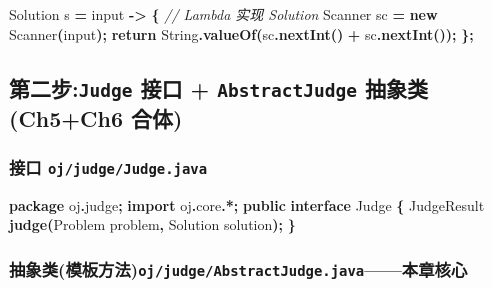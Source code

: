 \documentclass[
  11pt,
]{ctexart}
\newenvironment{Shaded}{\begin{snugshade}}{\end{snugshade}}
\newcommand{\BuiltInTok}[1]{#1}
\newcommand{\CommentTok}[1]{\textcolor[rgb]{0.56,0.35,0.01}{\textit{#1}}}
\newcommand{\ControlFlowTok}[1]{\textcolor[rgb]{0.13,0.29,0.53}{\textbf{#1}}}
\newcommand{\FunctionTok}[1]{\textcolor[rgb]{0.13,0.29,0.53}{\textbf{#1}}}
\newcommand{\ImportTok}[1]{#1}
\newcommand{\KeywordTok}[1]{\textcolor[rgb]{0.13,0.29,0.53}{\textbf{#1}}}
\newcommand{\NormalTok}[1]{#1}
\newcommand{\OperatorTok}[1]{\textcolor[rgb]{0.81,0.36,0.00}{\textbf{#1}}}
\begin{document}
\begin{Shaded}
\begin{Highlighting}[]
\NormalTok{Solution s }\OperatorTok{=}\NormalTok{ input }\OperatorTok{{-}\textgreater{}} \OperatorTok{\{}                 \CommentTok{// Lambda 实现 Solution}
    \BuiltInTok{Scanner}\NormalTok{ sc }\OperatorTok{=} \KeywordTok{new} \BuiltInTok{Scanner}\OperatorTok{(}\NormalTok{input}\OperatorTok{);}
    \ControlFlowTok{return} \BuiltInTok{String}\OperatorTok{.}\FunctionTok{valueOf}\OperatorTok{(}\NormalTok{sc}\OperatorTok{.}\FunctionTok{nextInt}\OperatorTok{()} \OperatorTok{+}\NormalTok{ sc}\OperatorTok{.}\FunctionTok{nextInt}\OperatorTok{());}
\OperatorTok{\};}
\end{Highlighting}
\end{Shaded}

\hypertarget{ux7b2cux4e8cux6b65judge-ux63a5ux53e3-abstractjudge-ux62bdux8c61ux7c7bch5ch6-ux5408ux4f53}{%
\subsection{\texorpdfstring{第二步:\texttt{Judge} 接口 +
\texttt{AbstractJudge} 抽象类(Ch5+Ch6
合体)}{第二步:Judge 接口 + AbstractJudge 抽象类(Ch5+Ch6 合体)}}\label{ux7b2cux4e8cux6b65judge-ux63a5ux53e3-abstractjudge-ux62bdux8c61ux7c7bch5ch6-ux5408ux4f53}}

\hypertarget{ux63a5ux53e3-ojjudgejudge.java}{%
\subsubsection{\texorpdfstring{接口
\texttt{oj/judge/Judge.java}}{接口 oj/judge/Judge.java}}\label{ux63a5ux53e3-ojjudgejudge.java}}

\begin{Shaded}
\begin{Highlighting}[]
\KeywordTok{package}\ImportTok{ oj}\OperatorTok{.}\ImportTok{judge}\OperatorTok{;}
\KeywordTok{import} \ImportTok{oj}\OperatorTok{.}\ImportTok{core}\OperatorTok{.*;}
\KeywordTok{public} \KeywordTok{interface}\NormalTok{ Judge }\OperatorTok{\{}
\NormalTok{    JudgeResult }\FunctionTok{judge}\OperatorTok{(}\NormalTok{Problem problem}\OperatorTok{,}\NormalTok{ Solution solution}\OperatorTok{);}
\OperatorTok{\}}
\end{Highlighting}
\end{Shaded}

\hypertarget{ux62bdux8c61ux7c7bux6a21ux677fux65b9ux6cd5ojjudgeabstractjudge.javaux672cux7ae0ux6838ux5fc3}{%
\subsubsection{\texorpdfstring{抽象类(模板方法)\texttt{oj/judge/AbstractJudge.java}------\textbf{本章核心}}{抽象类(模板方法)oj/judge/AbstractJudge.java------本章核心}}\label{ux62bdux8c61ux7c7bux6a21ux677fux65b9ux6cd5ojjudgeabstractjudge.javaux672cux7ae0ux6838ux5fc3}}
\end{document}
